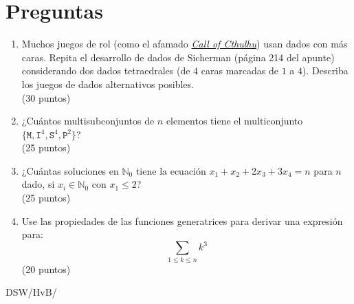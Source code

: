 \documentclass[spanish, fleqn]{article}
\title{Estructuras Discretas \\
       Tarea \#\num \\
       ``No son funciones, y no generan nada''}
\author{Discrete Structures Warriors}
\date{25 de mayo de 2015}
\begin{document}
\maketitle
\thispagestyle{empty}

\section*{Preguntas}

  \begin{enumerate}
  \item
    Muchos juegos de rol
    (como el afamado \href{http://en.wikipedia.org/wiki/Call_of_Cthulhu_(role-playing_game)}{\emph{Call of Cthulhu}})
    usan dados con más caras.
    Repita el desarrollo de dados de Sicherman
    (página 214 del apunte)
    considerando dos dados tetraedrales
    (de \(4\) caras
     marcadas de \(1\) a \(4\)).
     Describa los juegos de dados alternativos posibles.
    \\ \hspace*{\fill}(30 puntos)
  \item
    ¿Cuántos multisubconjuntos de \(n\) elementos
    tiene el multiconjunto
      \(\{\mathtt{M}, \mathtt{I}^4,
	  \mathtt{S}^4, \mathtt{P}^2\}\)?
    \\ \hspace*{\fill}(25 puntos)
  \item
    ¿Cuántas soluciones en \(\mathbb{N}_0\) tiene
    la ecuación \(x_1 + x_2 + 2 x_3 + 3 x_4 = n\)
    para \(n\) dado,
    si \(x_i \in \mathbb{N}_0\) con \(x_1 \le 2\)?
    \\ \hspace*{\fill}(25 puntos)
  \item
    Use las propiedades de las funciones generatrices
    para derivar una expresión para:
    \begin{equation*}
      \sum_{1 \le k \le n} k^3
    \end{equation*}
    \hspace*{\fill}(20 puntos)
  \end{enumerate}


  \vfill\hfill DSW/HvB/\LaTeXe
\end{document}
